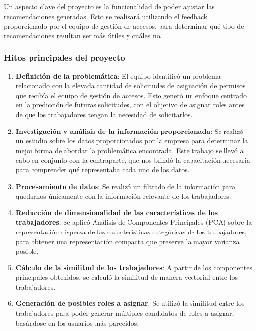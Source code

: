 \documentclass[11pt,letterpaper]{article}
\begin{document}
Un aspecto clave del proyecto es la funcionalidad de poder ajustar las
recomendaciones generadas. Esto se realizará utilizando el feedback
proporcionado por el equipo de gestión de accesos, para determinar qué
tipo de recomendaciones resultan ser más útiles y cuáles no.

\hypertarget{hitos-principales-del-proyecto}{%
\subsubsection{Hitos principales del
proyecto}\label{hitos-principales-del-proyecto}}

\begin{enumerate}
\def\labelenumi{\arabic{enumi}.}
\tightlist
\item
  \textbf{Definición de la problemática}: El equipo identificó un problema
  relacionado con la elevada cantidad de solicitudes de asignación de
  permisos que recibía el equipo de gestión de accesos. Esto generó un
  enfoque centrado en la predicción de futuras solicitudes, con el
  objetivo de asignar roles antes de que los trabajadores tengan la
  necesidad de solicitarlos.
\item
  \textbf{Investigación y análisis de la información proporcionada}: Se realizó
  un estudio sobre los datos proporcionados por la empresa para
  determinar la mejor forma de abordar la problemática encontrada. Este
  trabajo se llevó a cabo en conjunto con la contraparte, que nos brindó
  la capacitación necesaria para comprender qué representaba cada uno de
  los datos.
\item
  \textbf{Procesamiento de datos}: Se realizó un filtrado de la información para
  quedarnos únicamente con la información relevante de los trabajadores.
\item
  \textbf{Reducción de dimensionalidad de las características de los
  trabajadores}: Se aplicó Análisis de Componentes Principales (PCA)
  sobre la representación dispersa de las características categóricas de
  los trabajadores, para obtener una representación compacta que
  preserve la mayor varianza posible.
\item
  \textbf{Cálculo de la similitud de los trabajadores}: A partir de los
  componentes principales obtenidos, se calculó la similitud de manera
  vectorial entre los trabajadores.
\item
  \textbf{Generación de posibles roles a asignar}: Se utilizó la similitud entre
  los trabajadores para poder generar múltiples candidatos de roles a
  asignar, basándose en los usuarios más parecidos.

\end{enumerate}
\end{document}
